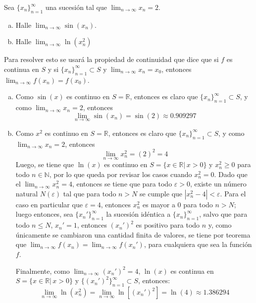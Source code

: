 \begin{enunciado}
 Sea $\{ x_n \}_{n=1}^\infty$ una sucesi\'on tal que $\lim_{n \to \infty} x_n = 2$.
 \begin{multicols}{2}
  \begin{enumerate}[(a)]
   \item Halle $\lim_{n\to\infty} \sin(x_n)$.
   
   \item Halle $\lim_{n\to\infty} \ln(x_n^2)$
  \end{enumerate}
 \end{multicols}
\end{enunciado}

\begin{solucion}
 Para resolver esto se usar\'a la propiedad de continuidad que dice que si $f$ es continua en $S$ y si $\{ x_n \}_{n=1}^{\infty} \subset S$ y $\lim_{n\to\infty} x_n = x_0$, entonces $\lim_{n\to\infty} f(x_n) = f(x_0)$.
 \begin{enumerate}[(a)]
  \item Como $\sin(x)$ es continuo en $S = \mathbb{R}$, entonces es claro que $\{ x_n \}_{n=1}^{\infty} \subset S$, y como $\lim_{n\to\infty} x_n = 2$, entonces 
  \begin{equation*}
   \lim_{n\to\infty} \sin(x_n) = \sin(2) \approx 0.909297
  \end{equation*}

  \item Como $x^2$ es continuo en $S = \mathbb{R}$, entonces es claro que $\{ x_{n} \}_{n=1}^{\infty} \subset S$, y como $\lim_{n\to\infty} x_n = 2$, entonces
  \begin{equation*}
   \lim_{n\to\infty} x_n^2 = (2)^2 = 4
  \end{equation*}
  Luego, se tiene que $\ln(x)$ es continuo en $S = \{ x\in \mathbb{R} | \, x > 0 \}$ y $x_n^2 \geq 0$ para todo $n \in \mathbb{N}$, por lo que queda por revisar los casos cuando $x_n^2 = 0$. Dado que el $\lim_{n\to\infty} x_n^2 = 4$, entonces se tiene que para todo $\varepsilon > 0$, existe un n\'umero natural $N(\varepsilon)$ tal que para todo $n>N$ se cumple que $|x_n^2 - 4| < \varepsilon$. Para el caso en particular que $\varepsilon = 4$, entonces $x_n^2$ es mayor a $0$ para todo $n > N$; luego entonces, sea $\{ x_n' \}_{n=1}^{\infty}$ la sucesi\'on id\'entica a $\{ x_n \}_{n=1}^{\infty}$, salvo que para todo $n \leq N$,  $x_n' = 1$, entonces $(x_n')^2$ es positivo para todo $n$ y, como \'unicamente se cambiaron una cantidad finita de valores, se tiene por teorema que $\lim_{n\to\infty} f(x_n) = \lim_{n\to\infty} f(x_n')$, para cualquiera que sea la funci\'on $f$.
  \par 
  Finalmente, como $\lim_{n\to\infty} \left( x_n' \right)^2 = 4$, $\ln(x)$ es continua en $S=\{ x\in\mathbb{R}| \, x> 0\}$ y $\{ (x_n')^2 \}_{n=1}^{\infty} \subset S$, entonces:
  \begin{equation*}
   \lim_{n\to\infty} \ln\left( x_n^2 \right) = \lim_{n\to\infty} \ln\left[ \left( x_n' \right)^2 \right] = \ln(4) \approx 1.386294
  \end{equation*}
 \end{enumerate}

\end{solucion}

